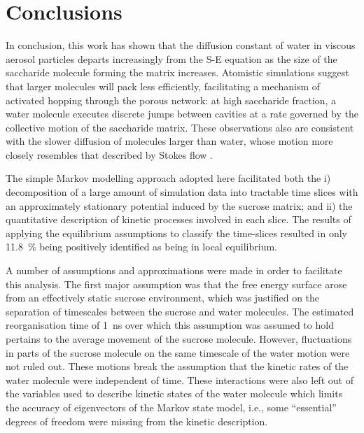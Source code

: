 \section{Conclusions}\label{sec:wat_conclusions}
In conclusion, this work has shown that the diffusion constant of water in viscous aerosol particles departs increasingly from the S-E equation as the size of the saccharide molecule forming the matrix increases. Atomistic simulations suggest that larger molecules will pack less efficiently, facilitating a mechanism of activated hopping through the porous network: at high saccharide fraction, a water molecule executes discrete jumps between cavities at a rate governed by the collective motion of the saccharide matrix. These observations also are consistent with the slower diffusion of molecules larger than water, whose motion more closely resembles that described by Stokes flow \cite{Gonzalez2015}.

The simple Markov modelling approach adopted here facilitated both the i) decomposition of a large amount of simulation data into tractable time slices with an approximately stationary potential induced by the sucrose matrix; and ii) the quantitative description of kinetic processes involved in each slice. The results of applying the equilibrium assumptions to classify the time-slices resulted in only \SI{11.8}{\percent} being positively identified as being in local equilibrium.

A number of assumptions and approximations were made in order to facilitate this analysis. The first major  assumption was that the free energy surface arose from an effectively static sucrose environment, which was justified on the separation of timescales between the sucrose and water molecules. The estimated reorganisation time of \SI{1}{\nano\second} over which this assumption was assumed to hold pertains to the average movement of the sucrose molecule. However, fluctuations in parts of the sucrose molecule on the same timescale of the water motion were not ruled out. These motions break the assumption that the kinetic rates of the water molecule were independent of time. These interactions were also left out of the variables used to describe kinetic states of the water molecule which limits the accuracy of eigenvectors of the Markov state model, i.e., some ``essential'' degrees of freedom were missing from the kinetic description.  


